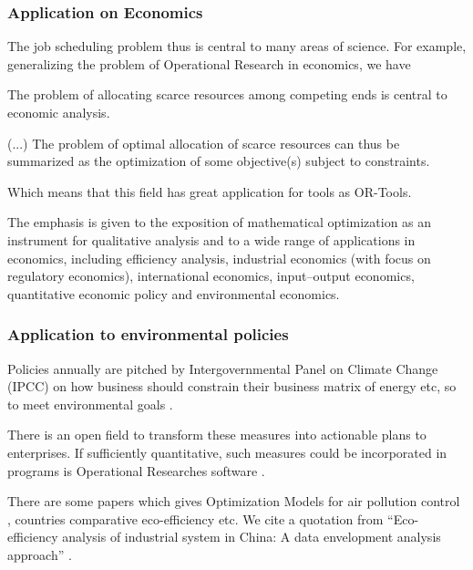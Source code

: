\documentclass[
12pt,				%
openright,			%
oneside,			%
a4paper,			%
brazil,				%
english,			%
]{abntex2}
\begin{document}
\subsubsection{Application on Economics}

The job scheduling problem thus is central to many areas of
science. For example, generalizing the problem of Operational
Research in economics, we have

\begin{citacao}
The problem of allocating scarce resources among competing ends is
central to economic analysis.

(...) The problem of optimal allocation of scarce resources can thus
be summarized as the optimization of some objective(s) subject to
constraints. \cite{luptacik2010mathematical}
\end{citacao}

Which means that this field has great application for tools as OR-Tools.

\begin{citacao}
The emphasis is given to the exposition of mathematical optimization as an
instrument for qualitative analysis and to a wide range of
applications in economics, including efficiency analysis, industrial
economics (with focus on regulatory economics), international
economics, input–output economics, quantitative economic policy and
environmental economics. \cite{luptacik2010mathematical}
\end{citacao}

\subsubsection{Application to environmental policies}
Policies annually are pitched by Intergovernmental Panel on Climate
Change (IPCC) on how business should constrain their business matrix
of energy etc, so to meet environmental goals
\cite{keysser20211}.

There is an open field to transform these
measures into actionable plans to enterprises. If sufficiently
quantitative, such measures could be incorporated in programs is
Operational Researches software \cite{luptacik2010mathematical}.

There are some papers which gives Optimization Models for
air pollution control \cite{abrams1975optimization}, countries comparative
eco-efficiency \cite{dyckhoff2001measuring} etc. We cite a quotation
from ``Eco-efficiency analysis of industrial system in China: A data
envelopment analysis approach'' \cite{zhang2008eco}.
\end{document}
